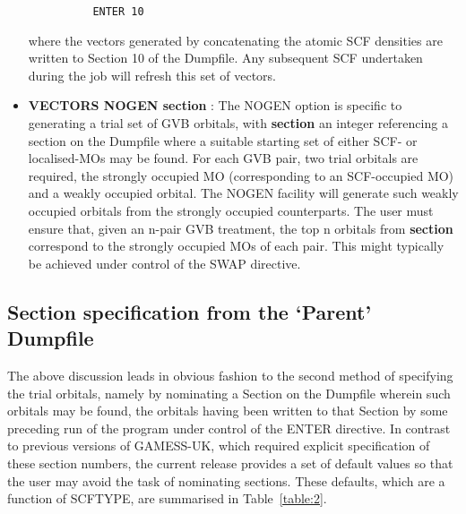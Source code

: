 \documentclass[11pt,fleqn]{article}
\begin{document}
\begin{itemize}
{
\footnotesize
\begin{verbatim}
          ENTER 10
\end{verbatim}
}
where the vectors generated by concatenating the atomic SCF densities
are written to Section 10 of the Dumpfile. Any subsequent
SCF undertaken during the job will refresh this set of vectors.

\item  {\bf VECTORS NOGEN section} : The NOGEN option is specific to
generating a trial set of GVB orbitals, with {\bf section}  an integer
referencing a section on the Dumpfile where a suitable starting set
of either SCF- or localised-MOs may be found.  For each GVB pair, two
trial orbitals are required, the strongly occupied MO (corresponding to
an SCF-occupied MO) and a weakly occupied orbital. The NOGEN facility
will generate such weakly occupied orbitals from the strongly occupied
counterparts. The user must ensure that, given an n-pair GVB treatment,
the top n orbitals from {\bf section}  correspond to the strongly occupied
MOs of each pair. This might typically be achieved under control of the
SWAP directive.  \end{itemize}

\subsection[Section specification from the `Parent' Dumpfile]{Section specification from the `Parent' Dumpfile}

The above discussion leads in obvious fashion to the second method of
specifying the trial orbitals, namely by nominating a Section on the
Dumpfile wherein such orbitals may be found, the orbitals having been
written to that Section by some preceding run of the program under control
of the ENTER directive.  In contrast to previous versions of GAMESS-UK,
which required explicit specification of these section numbers, the
current release provides a set of default values so that the user may
avoid the task of nominating sections. These defaults, which are a
function of SCFTYPE, are summarised in Table~\ref{table:2}.
\end{document}
